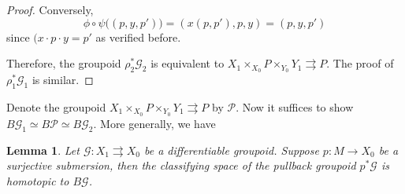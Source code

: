 \documentclass[12pt]{amsart}
\newtheorem{lem}[thm]{Lemma}
\theoremstyle{definition}
\theoremstyle{remark}
\numberwithin{equation}{section}
\newcommand{\CG}{{\mathcal G}}
\newcommand{\CP}{{\mathcal P}}
\begin{document}
\begin{proof}
	Conversely,
	\begin{equation}
	\phi\circ \psi \big((p,y,p')\big)=(x(p,p'),p,y)=(p,y,p' )
	\end{equation}	
	since $(x\cdot p\cdot y=p'$ as verified before.
	
	Therefore, the groupoid $\rho_2^*\CG_2$ is equivalent to $X_1\times_{X_0} P\times_{Y_0} Y_1 \rightrightarrows P$.
	The proof of $\rho_1^*\CG_1$ is similar.
	\end{proof}
Denote the groupoid $X_1\times_{X_0} P\times_{Y_0} Y_1 \rightrightarrows P$ by $\CP$. Now it suffices to show $B\CG_1\simeq B\CP \simeq B\CG_2$. More generally, we have
\begin{lem}
	Let $\CG: X_1\rightrightarrows X_0$ be a differentiable groupoid. Suppose $p:M\to X_0$ be a surjective submersion, then the classifying space of the  pullback groupoid $p^*\CG$ is homotopic to $B\CG$. 
\end{lem}
\end{document}
